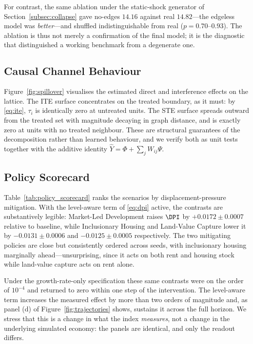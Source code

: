 For contrast, the same ablation under the static-shock generator of
Section~\ref{subsec:collapse} gave no-edges $14.16$ against real $14.82$---the
edgeless model was \emph{better}---and shuffled indistinguishable from real
($p = 0.70$--$0.93$). The ablation is thus not merely a confirmation of the
final model; it is the diagnostic that distinguished a working benchmark from a
degenerate one.

\subsection{Causal Channel Behaviour}

Figure~\ref{fig:spillover} visualises the estimated direct and interference
effects on the lattice. The ITE surface concentrates on the treated boundary,
as it must: by \eqref{eq:ite}, $\tau_i$ is identically zero at untreated units.
The STE surface spreads outward from the treated set with magnitude decaying in
graph distance, and is exactly zero at units with no treated neighbour. These
are structural guarantees of the decomposition rather than learned behaviour,
and we verify both as unit tests together with the additive identity
$\hat{Y} = \Phi + \sum_j W_{ij}\Psi$.

\subsection{Policy Scorecard}

Table~\ref{tab:policy_scorecard} ranks the scenarios by displacement-pressure
mitigation. With the level-aware term of \eqref{eq:dpi} active, the contrasts
are substantively legible: Market-Led Development raises $\DPI$ by
$+0.0172 \pm 0.0007$ relative to baseline, while Inclusionary Housing and
Land-Value Capture lower it by $-0.0131 \pm 0.0006$ and $-0.0125 \pm 0.0005$
respectively. The two mitigating policies are close but consistently ordered
across seeds, with inclusionary housing marginally ahead---unsurprising, since
it acts on both rent and housing stock while land-value capture acts on rent
alone.

Under the growth-rate-only specification these same contrasts were on the order
of $10^{-4}$ and returned to zero within one step of the intervention. The
level-aware term increases the measured effect by more than two orders of
magnitude and, as panel (d) of Figure~\ref{fig:trajectories} shows, sustains it
across the full horizon. We stress that this is a change in what the index
\emph{measures}, not a change in the underlying simulated economy: the panels
are identical, and only the readout differs.

